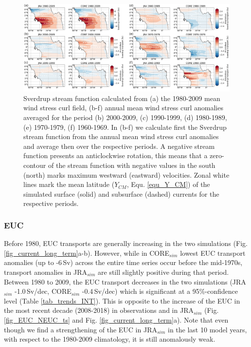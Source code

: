 \documentclass[os, manuscript]{copernicus}
\begin{document}
	\begin{figure}[t]
		\includegraphics[width=12cm]{../../figures/paper/f09_SV_maps_decadal_anomalies.png}
		\caption{Sverdrup stream function calculated from (a) the 1980-2009 mean wind stress curl field, (b-f) annual mean wind stress curl anomalies averaged for the period (b) 2000-2009, (c) 1990-1999, (d) 1980-1989, (e) 1970-1979, (f) 1960-1969. In (b-f) we calculate first the Sverdrup stream function from the annual mean wind stress curl anomalies and average then over the respective periods. A negative stream function presents an anticlockwise rotation, this means that a zero-contour of the stream function with negative values in the south (north) marks maximum westward (eastward) velocities. Zonal white lines mark the mean latitude ($ Y_{CM} $, Equ. \ref{equ_Y_CM}) of the simulated surface (solid) and subsurface (dashed) currents for the respective periods.}
		\label{fig_SV_long_term}
	\end{figure}
	
	\subsubsection{EUC}
	Before 1980, EUC transports are generally increasing in the two simulations (Fig. \ref{fig_current_long_term}a-b). However, while in CORE$_{sim}$ lowest EUC transport anomalies (up to -6$ \, $Sv) across the entire time series occur before the mid-1970s, transport anomalies in JRA$_{sim}$ are still slightly positive during that period. Between 1980 to 2009, the EUC transport decreases in the two simulations (JRA$_{sim}$ -1.0$ \, $Sv/dec, CORE$_{sim}$ -0.4$ \, $Sv/dec) which is significant at a 95$ \% $-confidence level (Table \ref{tab_trends_INT}). This is opposite to the increase of the EUC in the most recent decade (2008-2018) in observations and in JRA$_{sim}$ (Fig. \ref{fig_EUC_NEUC_ts} and Fig. \ref{fig_current_long_term}a). Note that even though we find a strengthening of the EUC in JRA$_{sim}$ in the last 10 model years, with respect to the 1980-2009 climatology, it is still anomalously weak.  
	
\end{document}
